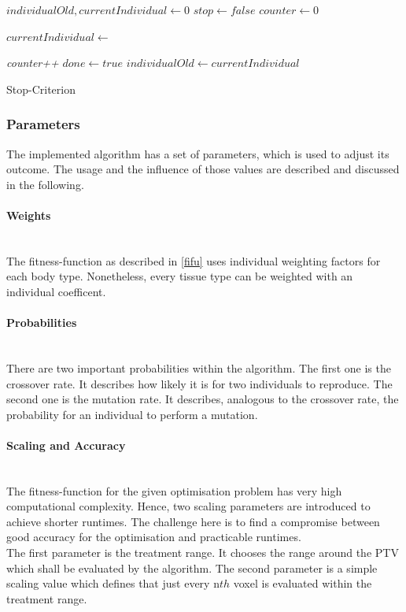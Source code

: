 \documentclass[12pt]{article}
\begin{document}
\begin{algorithm}[H]
$individualOld,currentIndividual \leftarrow 0$\;
$stop \leftarrow false$\;
$counter \leftarrow 0$\;
 {
 	
	$currentIndividual \leftarrow $\iter{}\;
	
	 {
		\emph{counter++}
	} 
	 {
		$done \leftarrow true$
	}  
	$individualOld \leftarrow currentIndividual $
	
	
	
	
	}
	 

\caption{Stop-Criterion}
\end{algorithm}  

\newpage
\subsubsection{Parameters}
The implemented algorithm has a set of parameters, which is used to adjust its outcome. The usage and the influence of those values are described and discussed in the following.

\paragraph{Weights}~\\
The fitness-function as described in \ref{fifu} uses individual weighting factors for each body type.  Nonetheless, every tissue type can be weighted with an individual coefficent. 

\paragraph{Probabilities} ~\\ 
There are two important probabilities within the algorithm. The first one is the crossover rate. It describes how likely it is for two individuals to reproduce. The second one is the mutation rate. It describes, analogous to the crossover rate, the probability for an individual to perform a mutation. 

\paragraph{Scaling and Accuracy}~\\
The fitness-function for the given optimisation problem has very high computational complexity. Hence, two scaling parameters are introduced to achieve shorter runtimes. The challenge here is to find a compromise between good accuracy for the optimisation and practicable runtimes.\\ The first parameter is the treatment range. It chooses the range around the PTV which shall be evaluated by the algorithm. The second parameter is a simple scaling value which defines that just every  n$th$ voxel is evaluated within the treatment range.
\end{document}
